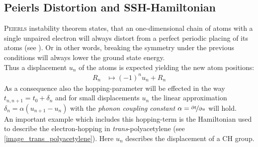 \subsection{Peierls Distortion and SSH-Hamiltonian}
\label{chapter_Peierls_SSH}
\textsc{Peierls} instability theorem states, that an one-dimensional chain of atoms with a single unpaired electron will always distort from a perfect periodic placing of its atoms (see \cite{chandrasekhar,nalwa}). Or in other words, breaking the symmetry under the previous conditions will always lower the ground state energy.\\
Thus a displacement $u_n$ of the atoms is expected yielding the new atom positions:
\begin{align}
	R_n &\mapsto (-1)^{n}u_n + R_n
\end{align}
As a consequence also the hopping-parameter will be effected in the way $t_{n, n+1} = t_0 + \delta_n$ and for small displacements $u_n$ the linear approximation $\delta_n = \alpha (u_{n+1} - u_n)$ with the \emph{phonon coupling constant} $\alpha = \nicefrac{\partial t}{\partial u}$ will hold.\\
An important example which includes this hopping-term is the Hamiltonian used to describe the electron-hopping in \emph{trans}-polyacetylene (see \cref{image_trans_polyacetylene}). Here $u_n$ describes the displacement of a CH group.\\
